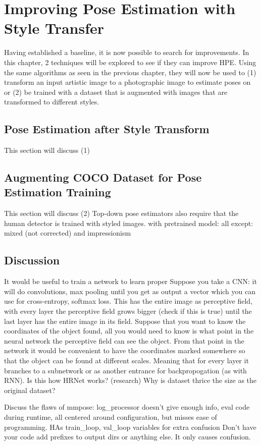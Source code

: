 \chapter{Improving Pose Estimation with Style Transfer}
\label{chap:improvements}
Having established a baseline, it is now possible to search for improvements.
In this chapter, 2 techniques will be explored to see if they can improve \gls{HPE}.
Using the same algorithms as seen in the previous chapter, they will now be used to
(1) transform an input artistic image to a photographic image to estimate poses on or
(2) be trained with a dataset that is augmented with images that are transformed to different styles.

\section{Pose Estimation after Style Transform}
This section will discuss (1)

\section{Augmenting COCO Dataset for Pose Estimation Training}
This section will discuss (2)
Top-down pose estimators also require that the human detector is trained with styled images.
with pretrained model: all except: mixed (not corrected) and impressionism

\section{Discussion}
It would be useful to train a network to learn proper 
Suppose you take a \gls{CNN}: it will do convolutions, max pooling until you get as output a vector which you can use for cross-entropy, softmax loss.
This has the entire image as perceptive field, with every layer the perceptive field grows bigger (check if this is true) until the last layer has the entire image in its field.
Suppose that you want to know the coordinates of the object found, all you would need to know is what point in the neural network the perceptive field can see the object.
From that point in the network it would be convenient to have the coordinates marked somewhere so that the object can be found at different scales.
Meaning that for every layer it branches to a subnetwork or as another entrance for backpropogation (as with RNN).
Is this how HRNet works? (research)
Why is dataset thrice the size as the original dataset?

Discuss the flaws of mmpose: log_processor doesn't give enough info, eval code during runtime, all centered around configuration, but misses ease of programming.
HAs train_loop, val_loop variables for extra confusion
Don't have your code add prefixes to output dirs or anything else. It only causes confusion.
